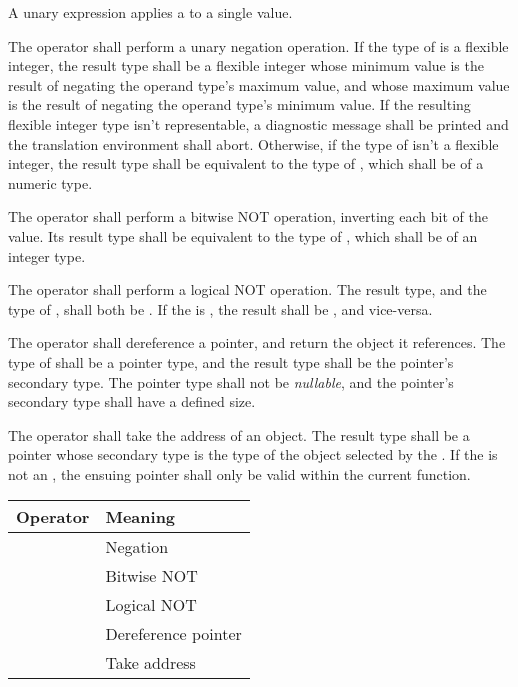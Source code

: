 \specsubsubitem
A unary expression applies a  to a single value.

\specsubsubitem
\specsubsubitem
The \terminal{-} operator shall perform a unary negation operation. If the type
of  is a flexible integer, the result type shall
be a flexible integer whose minimum value is the result of negating the operand
type's maximum value, and whose maximum value is the result of negating the
operand type's minimum value. If the resulting flexible integer type isn't
representable, a diagnostic message shall be printed and the translation
environment shall abort. Otherwise, if the type of
 isn't a flexible integer, the result type shall
be equivalent to the type of , which shall be of a
numeric type.

\specsubsubitem
The \terminal{\textasciitilde} operator shall perform a bitwise NOT operation,
inverting each bit of the value. Its result type shall be equivalent to the
type of , which shall be of an integer type.

\specsubsubitem
The \terminal{!} operator shall perform a logical NOT operation. The result
type, and the type of , shall both be
. If the  is , the
result shall be , and vice-versa.

\specsubsubitem
The \terminal{*} operator shall dereference a pointer, and return the object it
references.  The type of  shall be a pointer
type, and the result type shall be the pointer's secondary type. The pointer
type shall not be \textit{nullable}, and the pointer's secondary type shall have
a defined size.

\specsubsubitem
The \terminal{\&} operator shall take the address of an object. The result type
shall be a pointer whose secondary type is the type of the object selected by
the . If the  is not
an , the ensuing pointer shall only be valid within
the current function.


\begin{tabular}{r | l }
Operator & Meaning \\
\hline
\terminal{-} & Negation \\
\terminal{\textasciitilde} & Bitwise NOT \\
\terminal{!} & Logical NOT \\
\terminal{*} & Dereference pointer \\
\terminal{\&} & Take address \\
\end{tabular}

